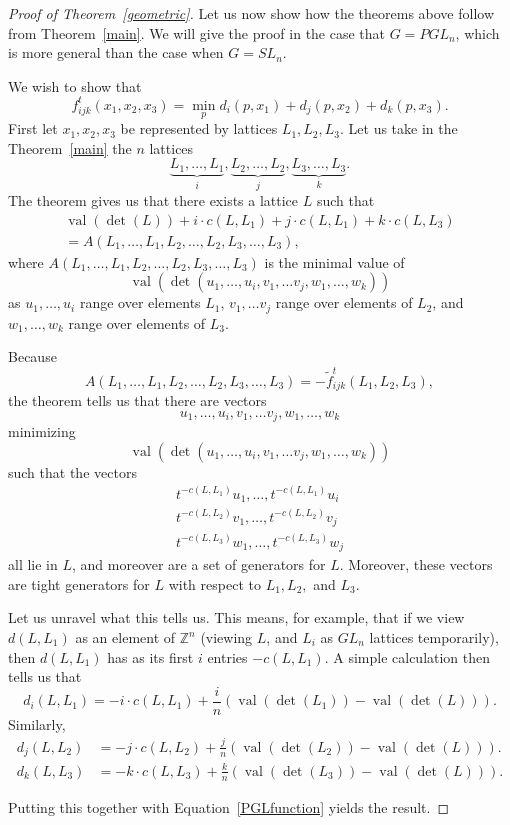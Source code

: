 \documentclass[ALCO,ThmDefs,Unicode,epreuves]{cedram}
\newcommand{\Z}{\mathbb{Z}}
\newcommand{\val}{\operatorname{val}}
\begin{document}
\begin{proof}[Proof of Theorem~\ref{geometric}] Let us now show how the theorems above follow from Theorem~\ref{main}. We will give the proof in the case that $G=PGL_n$, which is more general than the case when $G=SL_n$.




We wish to show that
\[
f_{ijk}^t (x_1,x_2,x_3) = \min_{p} d_i(p,x_1) + d_j(p,x_2) + d_k(p,x_3).
\]
First let $x_1, x_2, x_3$ be represented by lattices $L_1, L_2, L_3.$ Let us take in the Theorem~\ref{main} the $n$ lattices
\[
 \underbrace{L_1,\ldots,L_1}_{i}, \underbrace{L_2,\ldots,L_2}_{j}, \underbrace{L_3,\ldots,L_3}_{k}.
\]
The theorem gives us that there exists a lattice $L$ such that 
\begin{multline}\label{latticeeqn}
\val(\det(L)) + i \cdot c(L,L_1) + j \cdot c(L,L_1) + k \cdot c(L,L_3)\\
= A(L_1, \dots, L_1, L_2, \dots, L_2, L_3, \dots, L_3),
\end{multline}
where $A(L_1, \dots, L_1, L_2, \dots, L_2, L_3, \dots, L_3)$ is the minimal value of
\[
\val(\det(u_1, \dots, u_i, v_1, \dots v_j, w_1, \dots, w_k))
\]
as $u_1, \dots, u_i$ range over elements $L_1$, $v_1, \dots v_j$ range over elements of $L_2$, and $w_1, \dots, w_k$ range over elements of $L_3$.

Because
\[
A(L_1, \dots, L_1, L_2, \dots, L_2, L_3, \dots, L_3)=-\tilde{f}_{ijk}^t (L_1,L_2,L_3),
\]
the theorem tells us that there are vectors
\[
u_1, \dots, u_i, v_1, \dots v_j, w_1, \dots, w_k
\]
minimizing
\[
\val(\det(u_1, \dots, u_i, v_1, \dots v_j, w_1, \dots, w_k))
\]
such that the vectors
\begin{gather*}
t^{-c(L,L_1)}u_1, \dots, t^{-c(L,L_1)}u_i
\\
t^{-c(L,L_2)}v_1, \dots, t^{-c(L,L_2)}v_j
\\
t^{-c(L,L_3)}w_1, \dots, t^{-c(L,L_3)}w_j
\end{gather*}
all lie in $L$, and moreover are a set of generators for $L$. Moreover, these vectors are tight generators for $L$ with respect to $L_1, L_2,$ and $L_3$.

Let us unravel what this tells us. This means, for example, that if we view $d(L,L_1)$ as an element of $\Z^n$ (viewing $L$, and $L_i$ as $GL_n$ lattices temporarily), then $d(L,L_1)$ has as its first $i$ entries $-c(L,L_1)$. A simple calculation then tells us that 
\[
d_i(L,L_1) = -i \cdot c(L,L_1)+\frac{i}{n}(\val(\det(L_1))-\val(\det(L))).
\]
Similarly,
\begin{align*}
d_j(L,L_2) &= -j \cdot c(L,L_2)+\frac{j}{n}(\val(\det(L_2))-\val(\det(L))).
\\
d_k(L,L_3) &= -k \cdot c(L,L_3)+\frac{k}{n}(\val(\det(L_3))-\val(\det(L))).
\end{align*}

Putting this together with Equation~\eqref{PGLfunction} yields the result.
\end{proof}
\end{document}
